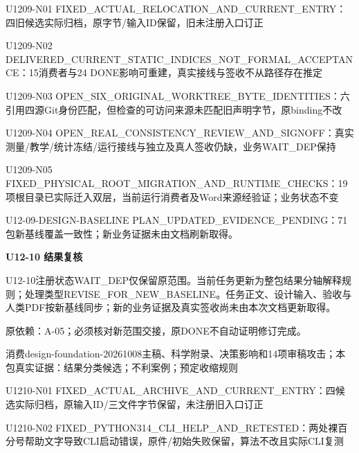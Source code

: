 \documentclass[11pt,a4paper]{article}
\newcommand{\reviewsection}[1]{\par\Needspace{5\baselineskip}\vspace{10pt}\begin{center}{\titlelatin\titlecjk\bfseries\fontsize{14}{20}\selectfont #1}\end{center}}
\begin{document}
U1209-\allowbreak{}N01 FIXED\_\allowbreak{}ACTUAL\_\allowbreak{}RELOCATION\_\allowbreak{}AND\_\allowbreak{}CURRENT\_\allowbreak{}ENTRY：四旧候选实际归档，原字节/\allowbreak{}输入ID保留，旧未注册入口订正


U1209-\allowbreak{}N02 DELIVERED\_\allowbreak{}CURRENT\_\allowbreak{}STATIC\_\allowbreak{}INDICES\_\allowbreak{}NOT\_\allowbreak{}FORMAL\_\allowbreak{}ACCEPTANCE：15消费者与24 DONE影响可重建，真实接线与签收不从路径存在推定


U1209-\allowbreak{}N03 OPEN\_\allowbreak{}SIX\_\allowbreak{}ORIGINAL\_\allowbreak{}WORKTREE\_\allowbreak{}BYTE\_\allowbreak{}IDENTITIES：六引用四源Git身份匹配，但检查的可访问来源未匹配旧声明字节，原binding不改


U1209-\allowbreak{}N04 OPEN\_\allowbreak{}REAL\_\allowbreak{}CONSISTENCY\_\allowbreak{}REVIEW\_\allowbreak{}AND\_\allowbreak{}SIGNOFF：真实测量/\allowbreak{}教学/\allowbreak{}统计冻结/\allowbreak{}运行接线与独立及真人签收仍缺，业务WAIT\_\allowbreak{}DEP保持


U1209-\allowbreak{}N05 FIXED\_\allowbreak{}PHYSICAL\_\allowbreak{}ROOT\_\allowbreak{}MIGRATION\_\allowbreak{}AND\_\allowbreak{}RUNTIME\_\allowbreak{}CHECKS：19项根目录已实际迁入双层，当前运行消费者及Word来源经验证；业务状态不变


U12-\allowbreak{}09-\allowbreak{}DESIGN-\allowbreak{}BASELINE PLAN\_\allowbreak{}UPDATED\_\allowbreak{}EVIDENCE\_\allowbreak{}PENDING：71包新基线覆盖一致性；新业务证据未由文档刷新取得。


\reviewsection{U12-\allowbreak{}10 结果复核}
U12-\allowbreak{}10注册状态WAIT\_\allowbreak{}DEP仅保留原范围。当前任务更新为整包结果分轴解释规则；处理类型REVISE\_\allowbreak{}FOR\_\allowbreak{}NEW\_\allowbreak{}BASELINE。任务正文、设计输入、验收与人类PDF按新基线同步；新的业务证据及真实签收尚未由本次文档更新取得。


原依赖：A-\allowbreak{}05；必须核对新范围交接，原DONE不自动证明修订完成。


消费design-\allowbreak{}foundation-\allowbreak{}20261008主稿、科学附录、决策影响和14项审稿攻击；本包真实证据：结果分类候选；不利案例；预定收缩规则


U1210-\allowbreak{}N01 FIXED\_\allowbreak{}ACTUAL\_\allowbreak{}ARCHIVE\_\allowbreak{}AND\_\allowbreak{}CURRENT\_\allowbreak{}ENTRY：四候选实际归档，原输入ID/\allowbreak{}三文件字节保留，未注册旧入口订正


U1210-\allowbreak{}N02 FIXED\_\allowbreak{}PYTHON314\_\allowbreak{}CLI\_\allowbreak{}HELP\_\allowbreak{}AND\_\allowbreak{}RETESTED：两处裸百分号帮助文字导致CLI启动错误，原件/\allowbreak{}初始失败保留，算法不改且实际CLI复测
\end{document}
